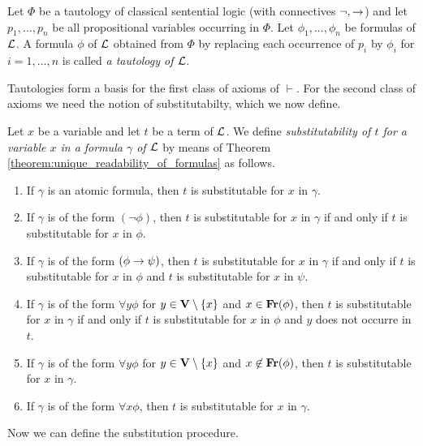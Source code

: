 \documentclass[10pt]{amsart}
\begin{document}
\begin{definition}
	Let $\Phi$ be a tautology of classical sentential logic (with connectives $\neg, \rightarrow$) and let $p_1,...,p_n$ be all propositional variables occurring in $\Phi$. Let $\phi_1,...,\phi_n$ be formulas of ${\mathcal L}$. A formula $\phi$ of ${\mathcal L}$ obtained from $\Phi$ by replacing each occurrence of $p_i$ by $\phi_i$ for $i = 1, ..., n$ is called \textit{a tautology of ${\mathcal L}$}.
\end{definition}
\noindent
Tautologies form a basis for the first class of axioms of $\vdash$. For the second class of axioms we need the notion of substitutabilty, which we now define.

\begin{definition}
	Let $x$ be a variable and let $t$ be a term of ${\mathcal L}$. We define \textit{substitutability of $t$ for a variable $x$ in a formula $\gamma$ of ${\mathcal L}$} by means of Theorem \ref{theorem:unique_readability_of_formulas} as follows.
	\begin{enumerate}[label=\textbf{(\arabic*)}, leftmargin=3.0em]
		\item If $\gamma$ is an atomic formula, then $t$ is substitutable for $x$ in $\gamma$.
		\item If $\gamma$ is of the form $(\neg \phi)$, then $t$ is substitutable for $x$ in $\gamma$ if and only if $t$ is substitutable for $x$ in $\phi$.
		\item If $\gamma$ is of the form $(\phi \rightarrow  \psi)$, then $t$ is substitutable for $x$ in $\gamma$ if and only if $t$ is substitutable for $x$ in $\phi$ and $t$ is substitutable for $x$ in $\psi$.
		\item If $\gamma$ is of the form $\forall y \phi$ for $y \in \mathbf{V}\setminus \{x\}$ and $x\in \mathbf{Fr}(\phi)$, then $t$ is substitutable for $x$ in $\gamma$ if and only if $t$ is substitutable for $x$ in $\phi$ and $y$ does not occurre in $t$.
		\item If $\gamma$ is of the form $\forall y \phi$ for $y \in \mathbf{V}\setminus \{x\}$ and $x\not \in \mathbf{Fr}(\phi)$, then $t$ is substitutable for $x$ in $\gamma$.
		\item If $\gamma$ is of the form $\forall x \phi$, then $t$ is substitutable for $x$ in $\gamma$.
	\end{enumerate}
\end{definition}
\noindent
Now we can define the substitution procedure.
\end{document}
